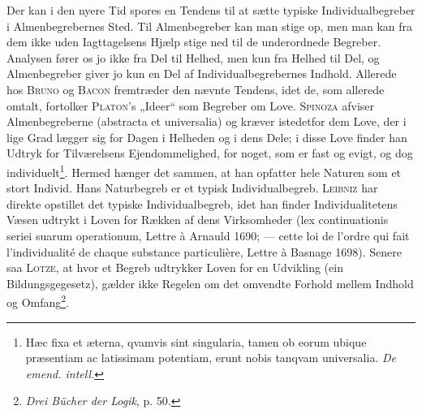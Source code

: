 \documentclass[12pt]{article}
\newcommand{\opage}[1]{\marginnote{\footnotesize\textit{[#1]}}}
\begin{document}
Der kan i den nyere Tid spores en Tendens til at sætte typiske
Individualbegreber i Almenbegrebernes Sted. Til Almenbegreber kan man stige op, men
man kan fra dem ikke uden Iagttagelsens Hjælp stige ned til de underordnede
Begreber. Analysen fører os jo ikke fra Del til Helhed, men kun fra Helhed til
Del, og Almenbegreber giver jo kun en Del af Individualbegrebernes Indhold.
Allerede hos \textsc{Bruno} og \textsc{Bacon} fremtræder den nævnte Tendens, idet de, som
allerede omtalt, fortolker \textsc{Platon}'s „Ideer“ som Begreber om Love. \textsc{Spinoza}
afviser Almenbegreberne (abstracta et universalia) og kræver istedetfor dem Love, der
i lige Grad lægger sig for Dagen i Helheden og i dens Dele; i disse Love finder han
Udtryk for Tilværelsens Ejendommelighed, for noget, som er fast og evigt, og dog
individuelt\footnote{Hæc fixa et æterna, qvamvis sint singularia, tamen ob eorum
ubique præsentiam ac latissimam potentiam, erunt nobis tanqvam universalia.
\textit{De emend. intell.}}. Hermed hænger det sammen, at han opfatter hele Naturen
som et stort Individ. Hans Naturbegreb er et typisk Individualbegreb. \textsc{Leibniz}
har direkte opstillet det typiske Individualbegreb, idet han finder
Individualitetens Væsen udtrykt i Loven for Rækken af dens Virksomheder (lex
continuationis seriei suarum operationum, Lettre à Arnauld 1690; --- cette loi de
l'ordre qui fait l'individualité de chaque
\setcounter{footnote}{0}%
\opage{34}substance particulière, Lettre à Basnage 1698). Senere saa \textsc{Lotze}, at hvor et
Begreb udtrykker Loven for en Udvikling (ein Bildungsgegesetz), gælder ikke Regelen
om det omvendte Forhold mellem Indhold og Omfang\footnote{\textit{Drei Bücher der
Logik}, p. 50.}.
\end{document}
